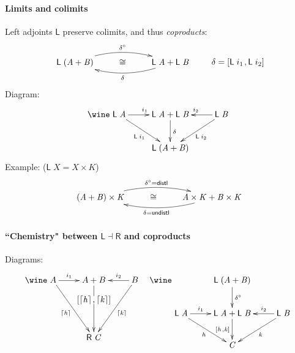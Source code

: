 \documentclass{elsarticle}
\newcommand{\Conid}[1]{\mathit{#1}}
\newcommand{\Varid}[1]{\mathit{#1}}
\def\myxym#1{\vcenter{\xymatrix{#1}}}
\def\alt#1#2{\mathopen{[}#1\hskip 1pt,#2\mathclose{]}}
\def\conv#1{#1^\circ}
\def\fun#1{\mathsf{#1}}
\def\iso{\cong}
\begin{document}
\paragraph{Limits and colimits}
Left adjoints \ensuremath{\fun L } preserve colimits, and thus \emph{coproducts}:
\begin{eqnarray*}
\myxym{
	\ensuremath{\fun L \;(\Conid{A}\mathbin{+}\Conid{B})}
 		\ar@/^1pc/[rr]^{\ensuremath{\conv{\delta}}}
&
	\iso
&
	\ensuremath{\fun L \;\Conid{A}\mathbin{+}\fun L \;\Conid{B}}
 		\ar@/^1pc/[ll]^{\ensuremath{\delta}}
}
&
	~~~~
&
	\ensuremath{\delta\mathrel{=}\alt{\fun L \;i_1}{\fun L \;i_2}}
\end{eqnarray*}
Diagram:
\begin{eqnarray*}\wine
\xymatrix{
	\ensuremath{\fun L \;\Conid{A}}
		\ar[r]^{i_1}
		\ar[dr]_{\ensuremath{\fun L \;i_1}}
&
	\ensuremath{\fun L \;\Conid{A}}+\ensuremath{\fun L \;\Conid{B}}
		\ar[d]^{\ensuremath{\delta}}
&
        \ensuremath{\fun L \;\Conid{B}}
		\ar[l]_{i_2}
		\ar[dl]^{\ensuremath{\fun L \;i_2}}
\\
&
	\ensuremath{\fun L \;(\Conid{A}\mathbin{+}\Conid{B})}
}
\end{eqnarray*}
Example: \hfill (\ensuremath{\fun L \;\Conid{X}\mathrel{=}\Conid{X} \times \Conid{K}})
\begin{eqnarray*}
\myxym{
	\ensuremath{(\Conid{A}\mathbin{+}\Conid{B}) \times \Conid{K}}
 		\ar@/^1pc/[rr]^{\ensuremath{\conv{\delta}\mathrel{=}\mathsf{distl}}}
&
	\iso
&
	\ensuremath{\Conid{A} \times \Conid{K}\mathbin{+}\Conid{B} \times \Conid{K}}
 		\ar@/^1pc/[ll]^{\ensuremath{\delta\mathrel{=}\mathsf{undistl}}}
}
\end{eqnarray*}
%

\paragraph{``Chemistry" between \ensuremath{\fun L \mathbin\dashv \fun R } and coproducts}
Diagrams:
\begin{eqnarray*}\wine
\xymatrix{
	A
		\ar[ddr]_{\ensuremath{\lceil \Varid{h}\rceil}}
		\ar[r]^-{\ensuremath{i_1}}
&
	A+B
		\ar[dd]|(.34)*{\ensuremath{\alt{\lceil \Varid{h}\rceil}{\lceil \Varid{k}\rceil}}}
&
	B
		\ar[l]_-{\ensuremath{i_2}}
		\ar[ddl]^{\ensuremath{\lceil \Varid{k}\rceil}}
\\
\\
&
	\ensuremath{\fun R \;\Conid{C}}
}
&&
	\wine
\xymatrix{
&
	\ensuremath{\fun L \;(\Conid{A}\mathbin{+}\Conid{B})}
		\ar[d]^-{\ensuremath{\conv{\delta}}}
\\
	\ensuremath{\fun L \;\Conid{A}}
		\ar[dr]_{\ensuremath{\Varid{h}}}
		\ar[r]^-{\ensuremath{i_1}}
&
	\ensuremath{\fun L \;\Conid{A}\mathbin{+}\fun L \;\Conid{B}}
		\ar[d]_{\ensuremath{\alt{\Varid{h}}{\Varid{k}}}}
&
	\ensuremath{\fun L \;\Conid{B}}
		\ar[l]_-{\ensuremath{i_2}}
		\ar[dl]^{\ensuremath{\Varid{k}}}
\\
&
	\ensuremath{\Conid{C}}
}
\end{eqnarray*}
\end{document}
